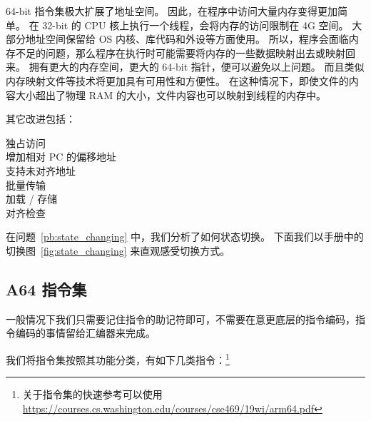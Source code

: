 64-bit 指令集极大扩展了地址空间。
因此，在程序中访问大量内存变得更加简单。
在 32-bit 的 CPU 核上执行一个线程，会将内存的访问限制在 4G 空间。
大部分地址空间保留给 OS 内核、库代码和外设等方面使用。
所以，程序会面临内存不足的问题，那么程序在执行时可能需要将内存的一些数据映射出去或映射回来。
拥有更大的内存空间，更大的 64-bit 指针，便可以避免以上问题。
而且类似内存映射文件等技术将更加具有可用性和方便性。
在这种情况下，即使文件的内容大小超出了物理 RAM 的大小，文件内容也可以映射到线程的内存中。

其它改进包括：
\begin{description}
  \item[独占访问]
  \item[增加相对 PC 的偏移地址]
  \item[支持未对齐地址]
  \item[批量传输]
  \item[加载 / 存储]
  \item[对齐检查]
\end{description}

在问题~\ref{pb:state_changing} 中，我们分析了如何状态切换。
下面我们以手册中的切换图~\ref{fig:state_changing} 来直观感受切换方式。


\subsection{A64 指令集}

一般情况下我们只需要记住指令的助记符即可，不需要在意更底层的指令编码，指令编码的事情留给汇编器来完成。

我们将指令集按照其功能分类，有如下几类指令：\footnote{关于指令集的快速参考可以使用 \url{https://courses.cs.washington.edu/courses/cse469/19wi/arm64.pdf}}

